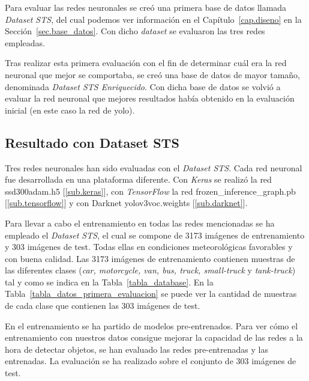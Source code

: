 Para evaluar las redes neuronales se creó una primera base de datos llamada \textit{Dataset STS}, del cual podemos ver información en el Capítulo~\ref{cap.diseno} en la Sección~\ref{sec.base_datos}. Con dicho \textit{dataset} se evaluaron las tres redes empleadas.

Tras realizar esta primera evaluación con el fin de determinar cuál era la red neuronal que mejor se comportaba, se creó una base de datos de mayor tamaño, denominada \textit{Dataset STS Enriquecido}. Con dicha base de datos se volvió a evaluar la red neuronal que mejores resultados había obtenido en la evaluación inicial (en este caso la red de \acrshort{yolo}).

\subsection{Resultado con Dataset STS}

Tres redes neuronales han sido evaluadas con el \textit{Dataset STS}. Cada red neuronal fue desarrollada en una plataforma diferente. Con \textit{Keras} se realizó la red ssd300adam.h5 [\ref{sub.keras}], con \textit{TensorFlow} la red frozen\_inference\_graph.pb [\ref{sub.tensorflow}] y con Darknet yolov3\-voc.weights [\ref{sub.darknet}]. 

Para llevar a cabo el entrenamiento en todas las redes mencionadas se ha empleado el \textit{Dataset STS}, el cual se compone de 3173 imágenes de entrenamiento y 303 imágenes de test. Todas ellas en condiciones meteorológicas favorables y con buena calidad. Las 3173 imágenes de entrenamiento contienen muestras de las diferentes clases (\textit{car, motorcycle, van, bus, truck, small-truck} y \textit{tank-truck}) tal y como se indica en la Tabla~\ref{tabla_database}. En la Tabla~\ref{tabla_datos_primera_evaluacion} se puede ver la cantidad de muestras de cada clase que contienen las 303 imágenes de test.

En el entrenamiento se ha partido de modelos pre-entrenados. Para ver cómo el entrenamiento con nuestros datos consigue mejorar la capacidad de las redes a la hora de detectar objetos, se han evaluado las redes pre-entrenadas y las entrenadas. La evaluación se ha realizado sobre el conjunto de 303 imágenes de test.

